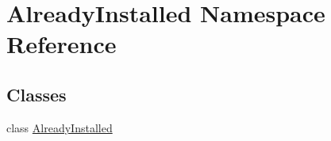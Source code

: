 \hypertarget{namespaceAlreadyInstalled}{\section{Already\-Installed Namespace Reference}
\label{namespaceAlreadyInstalled}
}
\subsection*{Classes}
\begin{DoxyCompactItemize}
\item 
class \hyperlink{classAlreadyInstalled_1_1AlreadyInstalled}{Already\-Installed}
\end{DoxyCompactItemize}

